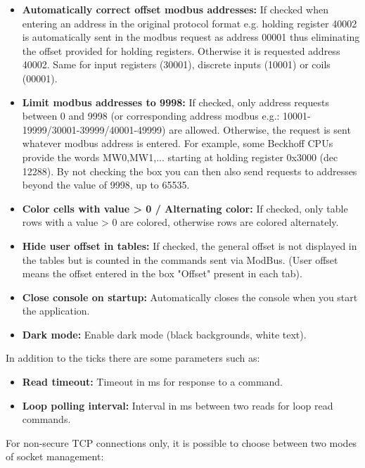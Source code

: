 \begin{itemize}
    \item \textbf{Automatically correct offset modbus addresses:}
    If checked when entering an address in the original protocol format e.g.
    holding register 40002 is automatically sent in the modbus request as address
    00001 thus eliminating the offset provided for holding registers. Otherwise it is 
    requested
    address 40002. Same for input registers (30001), discrete inputs (10001)
    or coils (00001).
    \item \textbf{Limit modbus addresses to 9998:}
    If checked, only address requests between 0 and 9998 (or corresponding address
    modbus e.g.: 10001-19999/30001-39999/40001-49999) are allowed. Otherwise, the request is sent
    whatever modbus address is entered. For example, some Beckhoff CPUs provide
    the words MW0,MW1,... starting at holding register 0x3000 (dec 12288). 
    By not checking the box
    you can then also send requests to addresses beyond the value of 9998, up to 65535.
    \item \textbf{Color cells with value > 0 / Alternating color:}
    If checked, only table rows with a value > 0 are colored, otherwise rows
    are colored alternately.
    \item \textbf{Hide user offset in tables:}
    If checked, the general offset is not displayed in the tables but is counted in the commands
    sent via ModBus. (User offset means the offset entered in the box "Offset" present
    in each tab).
    \item \textbf{Close console on startup:}
    Automatically closes the console when you start the application.
    \item \textbf{Dark mode:}
    Enable dark mode (black backgrounds, white text).
\end{itemize}

In addition to the ticks there are some parameters such as:

\begin{itemize}
    \item \textbf{Read timeout:}
    Timeout in ms for response to a command.
    \item \textbf{Loop polling interval:}
    Interval in ms between two reads for loop read commands.
\end{itemize}

For non-secure TCP connections only, it is possible to choose between two modes
of socket management:

